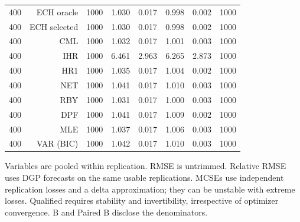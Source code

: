 \begin{table}[p]
\begin{tabular}{rrrrrrrr}
400 & ECH oracle & 1000 & 1.030 & 0.017 & 0.998 & 0.002 & 1000 \\
400 & ECH selected & 1000 & 1.030 & 0.017 & 0.998 & 0.002 & 1000 \\
400 & CML & 1000 & 1.032 & 0.017 & 1.001 & 0.003 & 1000 \\
400 & IHR & 1000 & 6.461 & 2.963 & 6.265 & 2.873 & 1000 \\
400 & HR1 & 1000 & 1.035 & 0.017 & 1.004 & 0.002 & 1000 \\
400 & NET & 1000 & 1.041 & 0.017 & 1.010 & 0.003 & 1000 \\
400 & RBY & 1000 & 1.031 & 0.017 & 1.000 & 0.003 & 1000 \\
400 & DPF & 1000 & 1.041 & 0.017 & 1.009 & 0.002 & 1000 \\
400 & MLE & 1000 & 1.037 & 0.017 & 1.006 & 0.003 & 1000 \\
400 & VAR (BIC) & 1000 & 1.042 & 0.017 & 1.010 & 0.003 & 1000 \\
\bottomrule\end{tabular}
\par\medskip
\begin{minipage}{0.98\linewidth}\footnotesize Variables are pooled within replication. RMSE is untrimmed. Relative RMSE uses DGP forecasts on the same usable replications. MCSEs use independent replication losses and a delta approximation; they can be unstable with extreme losses. Qualified requires stability and invertibility, irrespective of optimizer convergence. B and Paired B disclose the denominators.\end{minipage}
\end{table}
